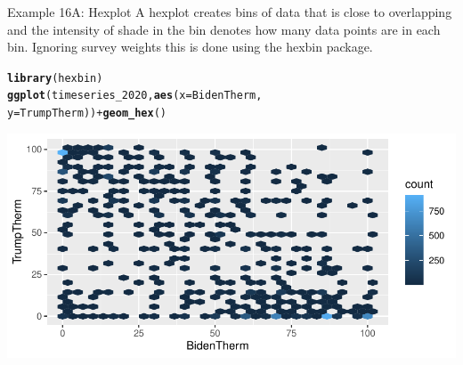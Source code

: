 \documentclass{beamer}\usepackage[]{graphicx}\usepackage[]{xcolor}
\makeatletter
\newcommand{\hlopt}[1]{\textcolor[rgb]{0,0,0}{#1}}%
\newcommand{\hlstd}[1]{\textcolor[rgb]{0.345,0.345,0.345}{#1}}%
\newcommand{\hlkwc}[1]{\textcolor[rgb]{0.333,0.667,0.333}{#1}}%
\newcommand{\hlkwd}[1]{\textcolor[rgb]{0.737,0.353,0.396}{\textbf{#1}}}%
\newenvironment{kframe}{%
 \def\at@end@of@kframe{}%
 \ifinner\ifhmode%
  \def\at@end@of@kframe{\end{minipage}}%
  \begin{minipage}{\columnwidth}%
 \fi\fi%
 \def\FrameCommand##1{\hskip\@totalleftmargin \hskip-\fboxsep
 \colorbox{shadecolor}{##1}\hskip-\fboxsep
     \hskip-\linewidth \hskip-\@totalleftmargin \hskip\columnwidth}%
 \MakeFramed {\advance\hsize-\width
   \@totalleftmargin\z@ \linewidth\hsize
   \@setminipage}}%
 {\par\unskip\endMakeFramed%
 \at@end@of@kframe}
\newenvironment{knitrout}{}{} %
\makeatother
\begin{document}
\begin{frame}[fragile]{Example 16A: Hexplot}
A hexplot creates bins of data that is close to overlapping and the intensity of shade in the bin denotes how many data points are in each bin. Ignoring survey weights this is done using the hexbin package.
\begin{knitrout}
\color{fgcolor}\begin{kframe}
\begin{alltt}
\hlkwd{library}\hlstd{(hexbin)}
\hlkwd{ggplot}\hlstd{(timeseries_2020,} \hlkwd{aes}\hlstd{(}\hlkwc{x} \hlstd{= BidenTherm,}
    \hlkwc{y} \hlstd{= TrumpTherm))} \hlopt{+} \hlkwd{geom_hex}\hlstd{()}
\end{alltt}
\end{kframe}
\includegraphics[width=0.95\linewidth]{figure/unnamed-chunk-81-1} 
\end{knitrout}


\end{frame}
\end{document}
